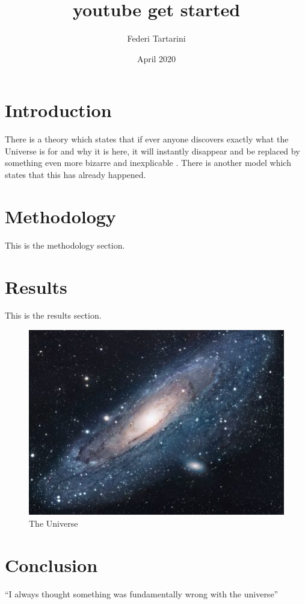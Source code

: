 \documentclass{article}
\title{youtube get started}
\author{Federi Tartarini}
\date{April 2020}
\begin{document}
\maketitle

\section{Introduction}
There is a theory which states that if ever anyone discovers exactly what the Universe is for and why it is here, it will instantly disappear and be replaced by something even more bizarre and inexplicable \cite{databaseII}.
There is another model which states that this has already happened.

\section{Methodology}
This is the methodology section.

\section{Results}
This is the results section.

\begin{figure}[h!]
\centering
\includegraphics[scale=1.7]{universe}
\caption{The Universe}
\label{fig:universe}
\end{figure}

\section{Conclusion}
``I always thought something was fundamentally wrong with the universe'' \citep{adams1995hitchhiker}



\end{document}
